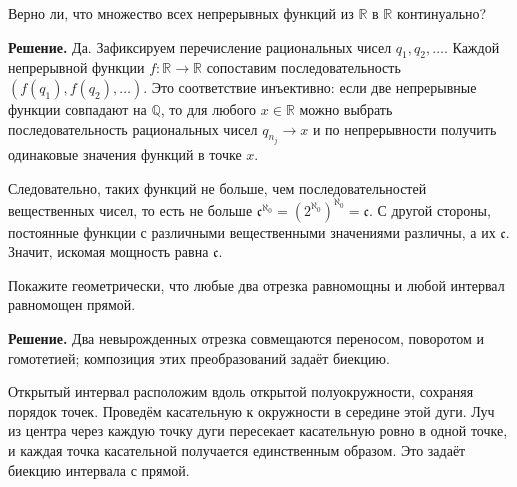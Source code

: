 \begin{problems}
\item Верно ли, что множество всех непрерывных функций из $\mathbb R$ в $\mathbb R$ континуально?
\par\smallskip\noindent\textbf{Решение.} Да. Зафиксируем перечисление рациональных чисел $q_1,q_2,\ldots$. Каждой непрерывной функции $f\colon\mathbb R\to\mathbb R$ сопоставим последовательность $(f(q_1),f(q_2),\ldots)$. Это соответствие инъективно: если две непрерывные функции совпадают на $\mathbb Q$, то для любого $x\in\mathbb R$ можно выбрать последовательность рациональных чисел $q_{n_j}\to x$ и по непрерывности получить одинаковые значения функций в точке $x$.
\par Следовательно, таких функций не больше, чем последовательностей вещественных чисел, то есть не больше $\mathfrak c^{\aleph_0}=(2^{\aleph_0})^{\aleph_0}=\mathfrak c$. С другой стороны, постоянные функции с различными вещественными значениями различны, а их $\mathfrak c$. Значит, искомая мощность равна $\mathfrak c$.\par

\item Покажите геометрически, что любые два отрезка равномощны и любой интервал равномощен прямой.
\par\smallskip\noindent\textbf{Решение.} Два невырожденных отрезка совмещаются переносом, поворотом и гомотетией; композиция этих преобразований задаёт биекцию.
\par Открытый интервал расположим вдоль открытой полуокружности, сохраняя порядок точек. Проведём касательную к окружности в середине этой дуги. Луч из центра через каждую точку дуги пересекает касательную ровно в одной точке, и каждая точка касательной получается единственным образом. Это задаёт биекцию интервала с прямой.\par


\end{problems}
